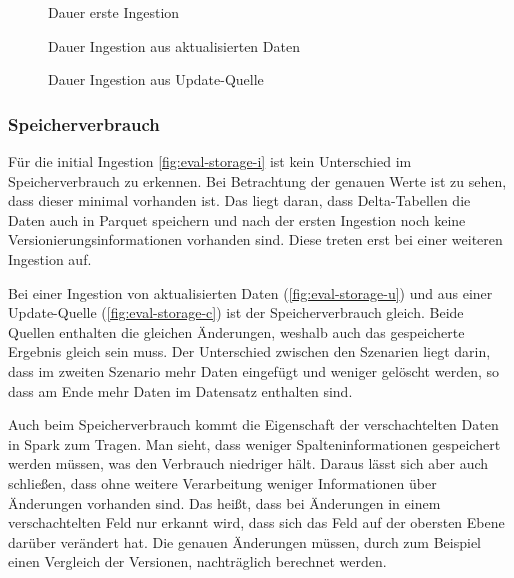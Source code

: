 \begin{figure}
    \centering
    \caption{Dauer erste Ingestion}
    
    \label{fig:eval-time-i}
\end{figure}

\begin{figure}
    \centering
    \caption{Dauer Ingestion aus aktualisierten Daten}
    
    \label{fig:eval-time-u}
\end{figure}

\begin{figure}
    \centering
    \caption{Dauer Ingestion aus Update-Quelle}
    
    \label{fig:eval-time-c}
\end{figure}

\subsubsection{Speicherverbrauch}

Für die initial Ingestion \cref{fig:eval-storage-i} ist kein Unterschied im Speicherverbrauch zu erkennen.
Bei Betrachtung der genauen Werte ist zu sehen, dass dieser minimal vorhanden ist.
Das liegt daran, dass Delta-Tabellen die Daten auch in Parquet speichern und nach der ersten Ingestion noch keine Versionierungsinformationen vorhanden sind.
Diese treten erst bei einer weiteren Ingestion auf.

Bei einer Ingestion von aktualisierten Daten (\cref{fig:eval-storage-u}) und aus einer Update-Quelle (\cref{fig:eval-storage-c}) ist der Speicherverbrauch gleich.
Beide Quellen enthalten die gleichen Änderungen, weshalb auch das gespeicherte Ergebnis gleich sein muss.
Der Unterschied zwischen den Szenarien liegt darin, dass im zweiten Szenario mehr Daten eingefügt und weniger gelöscht werden, so dass am Ende mehr Daten im Datensatz enthalten sind.

Auch beim Speicherverbrauch kommt die Eigenschaft der verschachtelten Daten in Spark zum Tragen.
Man sieht, dass weniger Spalteninformationen gespeichert werden müssen, was den Verbrauch niedriger hält.
Daraus lässt sich aber auch schließen, dass ohne weitere Verarbeitung weniger Informationen über Änderungen vorhanden sind.
Das heißt, dass bei Änderungen in einem verschachtelten Feld nur erkannt wird, dass sich das Feld auf der obersten Ebene darüber verändert hat.
Die genauen Änderungen müssen, durch zum Beispiel einen Vergleich der Versionen, nachträglich berechnet werden.


